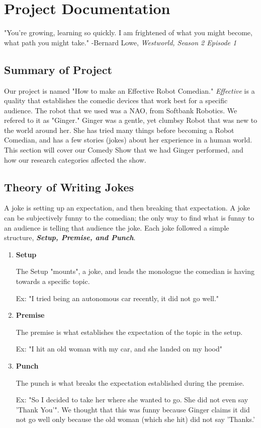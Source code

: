 
\section{Project Documentation}

	\begin{displayquote}
	"You're growing, learning so quickly. I am frightened of what you might become, what path you might take."
	-Bernard Lowe, \textit{Westworld, Season 2 Episode 1}
	\end{displayquote}

\subsection{Summary of Project}
Our project is named "How to make an Effective Robot Comedian."
\textit{Effective} is a quality that establishes the comedic devices that work best for a specific audience.
The robot that we used was a NAO, from Softbank Robotics. We refered to it as "Ginger."
Ginger was a gentle, yet clumbsy Robot that was new to the world around her.
She has tried many things before becoming a Robot Comedian, and has a few stories (jokes) about her experience in a human world.
This section will cover our Comedy Show that we had Ginger performed, and how our research categories affected the show.


\subsection{Theory of Writing Jokes}
A joke is setting up an expectation, and then breaking that expectation.
A joke can be subjectively funny to the comedian; the only way to find what is funny to an audience is telling that audience the joke.
Each joke followed a simple structure, \textit{\textbf{Setup, Premise, and Punch}}.

    \begin{enumerate}
        \item{\textbf{Setup}}

            The Setup "mounts", a joke, and leads the monologue the comedian is having towards a specific topic.


            Ex: "I tried being an autonomous car recently, it did not go well."
        \item{\textbf{Premise}}

            The premise is what establishes the expectation of the topic in the setup.


            Ex: "I hit an old woman with my car, and she landed on my hood"
        \item{\textbf{Punch}}

            The punch is what breaks the expectation established during the premise.


            Ex: "So I decided to take her where she wanted to go. She did not even say 'Thank You'".
            We thought that this was funny because Ginger claims it did not go well only because the old woman (which she hit) did not say 'Thanks.'
    \end{enumerate}

